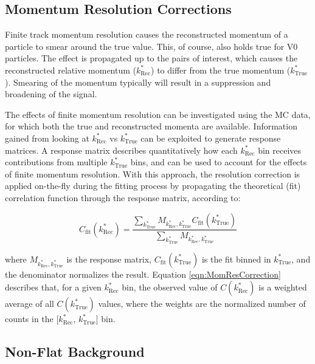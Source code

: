 \documentclass[ALICE,manyauthors]{cernphprep}
\newcommand{\ktrue}{$k^{*}_{\mathrm{True}}$\xspace}
\newcommand{\krec}{$k^{*}_{\mathrm{Rec}}$\xspace}
\begin{document}
\subsection{Momentum Resolution Corrections}
\label{MomentumResolutionCorrections}

Finite track momentum resolution causes the reconstructed momentum of a particle to smear around the true value.
This, of course, also holds true for V0 particles.
The effect is propagated up to the pairs of interest, which causes the reconstructed relative momentum (\krec) to differ from the true momentum (\ktrue).
Smearing of the momentum typically will result in a suppression and broadening of the signal.


The effects of finite momentum resolution can be investigated using the MC data, for which both the true and reconstructed momenta are available.
Information gained from looking at \krec vs \ktrue can be exploited to generate response matrices.
A response matrix describes quantitatively how each \krec bin receives contributions from multiple \ktrue bins, and can be used to account for the effects of finite momentum resolution.
With this approach, the resolution correction is applied on-the-fly during the fitting process by propagating the theoretical (fit) correlation function through the response matrix, according to:  

\begin{equation}
  C_{\mathrm{fit}}(k^{*}_{\mathrm{Rec}}) = \dfrac{\sum\limits_{k^{*}_{\mathrm{True}}}M_{k^{*}_{\mathrm{Rec}},k^{*}_{\mathrm{True}}}C_{\mathrm{fit}}(k^{*}_{\mathrm{True}})}{\sum\limits_{k^{*}_{\mathrm{True}}}M_{k^{*}_{\mathrm{Rec}},k^{*}_{\mathrm{True}}}}
\label{eqn:MomResCorrection}
\end{equation}

where $M_{k^{*}_{\mathrm{Rec}},k^{*}_{\mathrm{True}}}$ is the response matrix, $C_{\mathrm{fit}}(k^{*}_{\mathrm{True}})$ is the fit binned in \ktrue, and the denominator normalizes the result.
Equation \ref{eqn:MomResCorrection} describes that, for a given \krec bin, the observed value of $C(k^{*}_{\mathrm{Rec}})$ is a weighted average of all $C(k^{*}_{\mathrm{True}})$ values, where the weights are the normalized number of counts in the [\krec, \ktrue] bin.



\subsection{Non-Flat Background}
\label{NonFlatBackground}
\end{document}
